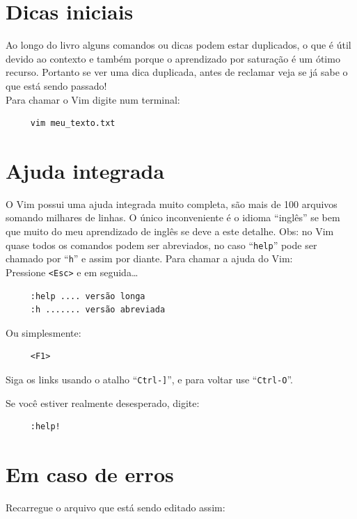 \documentclass[10pt,a4paper,openany]{book}
\begin{document}
\section{Dicas iniciais}\label{Dicas iniciais}

Ao longo do livro alguns comandos ou dicas podem estar duplicados, o que
é útil devido ao contexto e também porque o aprendizado por saturação
é um ótimo recurso. Portanto se ver uma dica duplicada, antes de
reclamar veja se já sabe o que está sendo passado! \\

Para chamar o Vim digite num terminal:

\begin{verbatim}
     vim meu_texto.txt
\end{verbatim}

\section{Ajuda integrada}

O Vim possui uma ajuda integrada muito completa, são mais de 100 arquivos
somando milhares de linhas. O único inconveniente é o idioma ``inglês'' se bem
que muito do meu aprendizado de inglês se deve a este detalhe.
Obs: no Vim quase todos os comandos podem ser abreviados, no caso
``\verb+help+'' pode ser chamado por ``\verb+h+'' e assim por diante.
Para chamar a ajuda do Vim:  \\

Pressione \verb|<Esc>| e em seguida\dots

\begin{verbatim}
     :help .... versão longa
     :h ....... versão abreviada
\end{verbatim}

Ou simplesmente:

\begin{verbatim}
     <F1>
\end{verbatim}

Siga os links usando o atalho ``\verb|Ctrl-]|'', e para voltar use
  ``\verb|Ctrl-O|''.

Se você estiver realmente desesperado, digite:

\begin{verbatim}
     :help!
\end{verbatim}

\section{Em caso de erros }\label{Em caso de erros }
Recarregue o arquivo que está sendo editado assim:
\end{document}
